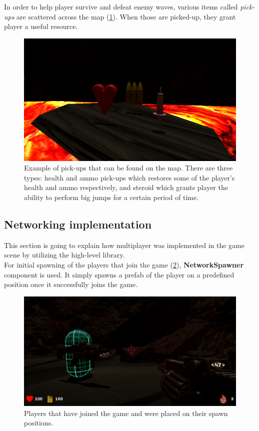 \documentclass[times, utf8, diplomski]{fer}
\begin{document}
In order to help player survive and defeat enemy waves, various items called \textit{pick-ups} are scattered across the map (\ref{fig:game-pick-ups}). When those are picked-up, they grant player a useful resource.

\begin{figure}[H]
	\centering
	\includegraphics[scale=0.55]{Game-pick-ups}
	\caption{Example of pick-ups that can be found on the map. There are three types: health and ammo pick-ups which restores some of the player's health and ammo respectively, and steroid which grants player the ability to perform big jumps for a certain period of time.}
	\label{fig:game-pick-ups}
\end{figure}

\subsection{Networking implementation}
This section is going to explain how multiplayer was implemented in the game scene by utilizing the high-level library.\\

For initial spawning of the players that join the game (\ref{fig:game-players-at-spawn}), \textbf{NetworkSpawner} component is used. It simply spawns a prefab of the player on a predefined position once it successfully joins the game.\\

\begin{figure}[H]
	\centering
	\includegraphics[scale=0.5]{Game-players-at-spawn}
	\caption{Players that have joined the game and were placed on their spawn positions.}
	\label{fig:game-players-at-spawn}
\end{figure}
\end{document}

